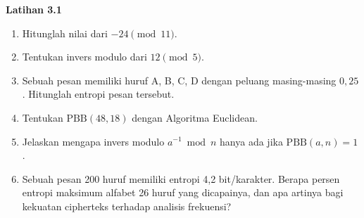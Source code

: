 \begin{obereflection}
\textbf{Latihan 3.1}
\begin{enumerate}
    \item Hitunglah nilai dari $-24 \pmod{11}$.
    \item Tentukan invers modulo dari $12 \pmod{5}$.
    \item Sebuah pesan memiliki huruf A, B, C, D dengan peluang masing-masing
          $0{,}25$. Hitunglah entropi pesan tersebut.
    \item Tentukan $\text{PBB}(48,18)$ dengan Algoritma Euclidean.
    \item Jelaskan mengapa invers modulo $a^{-1} \bmod n$ hanya ada jika
          $\text{PBB}(a,n) = 1$.
    \item Sebuah pesan 200 huruf memiliki entropi 4,2 bit/karakter. Berapa persen
          entropi maksimum alfabet 26 huruf yang dicapainya, dan apa artinya bagi
          kekuatan cipherteks terhadap analisis frekuensi?
\end{enumerate}
\end{obereflection}
